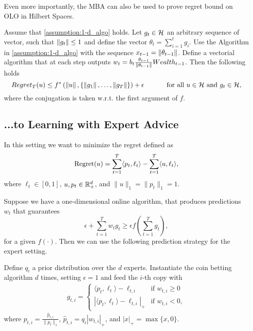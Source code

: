 Even more importantly, the \ac{MBA} can also be used to prove regret bound on \ac{OLO} in Hilbert Spaces.

\begin{theorem}
\label{theo:hilbert_reward}
  Assume that \ref{assumption:1-d_algo} holds.
  Let $g_t \in \mathcal{H}$ an arbitrary sequence of vector, such that $\left\|{g_t}\right\| \leq 1$ and define the vector $\theta_t=\sum_{i=1}^{t} g_i$.
  Use the Algorithm in \ref{assumption:1-d_algo} with the sequence $x_{t-1}= \left\|{\theta_{t-1}}\right\|$.
  Define a vectorial algorithm that at each step outputs $w_t = b_t \frac{\theta_{t-1}}{\left\|{\theta_{t-1}}\right\|} Wealth_{t-1}$. Then the following holds
  \[
    Regret_T(u) \leq f^*\left( \left\|{u}\right\|, \left\{\left\|{g_1}\right\|, \ldots, \left\|{g_T}\right\|\right\}\right)+\epsilon \quad \quad \quad \textnormal{ for all } u \in \mathcal{H} \textnormal{ and } g_t \in \mathcal{H},
  \]
  where the conjugation is taken w.r.t. the first argument of $f$.
\end{theorem}

\subsection{...to Learning with Expert Advice}

In this setting we want to minimize the regret defined as
\[
\operatorname{Regret}(u) = \sum_{t=1}^T \langle p_t, \ell_t \rangle - \sum_{t=1}^T \langle u, \ell_t \rangle,
\]
where $\ell_t \in [0,1]$, $u, p_t \in \mathbb{R}^d_+$, and $\|u\|_1 = \|p_t\|_1 = 1$.

Suppose we have a one-dimensional online algorithm, that produces
predictions $w_t$ that guarantees
\[
\epsilon + \sum_{t=1}^T w_t g_t \ge \epsilon f\left(\sum_{t=1}^T g_t\right),
\]
for a given $f(\cdot)$. Then we can use the following prediction strategy for the expert setting.

Define $q_i$ a prior distribution over the $d$ experts. Instantiate the coin
betting algorithm $d$ times, setting $\epsilon =1$ and feed the $i$-th copy with
\begin{align}
g_{t,i} = \begin{cases}
\langle p_t, \ell_t\rangle - \ell_{t,i} & \text{if } w_{t,i} \ge 0 \\
|\langle p_t, \ell_t\rangle - \ell_{t,i}|_+ & \text{if } w_{t,i} < 0,
\end{cases}
\end{align}
where $p_{t,i} = \frac{\hat{p}_{t,i}}{\|p_{t}\|_1}$, $\hat{p}_{t,i}=q_i |w_{t,i}|_+$, and $|x|_+=\max\{x,0\}$.

